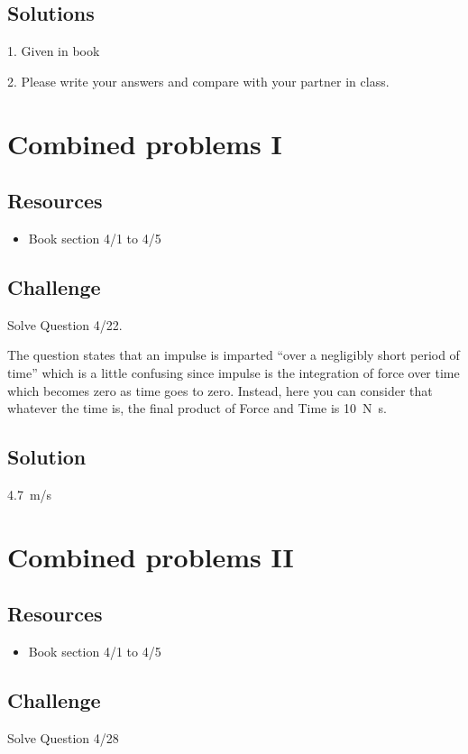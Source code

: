 \subsection*{Solutions}
1. Given in book

2. Please write your answers and compare with your partner in class.




\newpage
\section{Combined problems I}

\subsection*{Resources}
\begin{itemize}
    \item Book section 4/1 to 4/5
\end{itemize}

\subsection*{Challenge}
Solve Question 4/22.

The question states that an impulse is imparted ``over a negligibly short period of time'' which is a little confusing since impulse is the integration of force over time which becomes zero as time goes to zero. Instead, here you can consider that whatever the time is, the final product of Force and Time is \SI{10}{\newton\second}.

\subsection*{Solution}
\SI{4.7}{m/s}




\newpage
\section{Combined problems II}

\subsection*{Resources}
\begin{itemize}
    \item Book section 4/1 to 4/5
\end{itemize}

\subsection*{Challenge}
Solve Question 4/28

